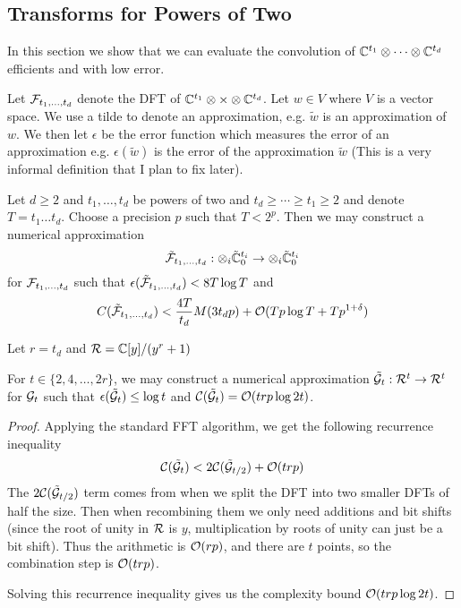 \subsection{Transforms for Powers of Two}

In this section we show that we can evaluate the convolution of ${\mathbb C}^{t_1} \otimes \cdots \otimes {\mathbb C}^{t_d}$ efficients and with low error.

Let $\mathcal F_{t_1, \ldots, t_d}$ denote the DFT of ${\mathbb C}^{t_1} \otimes \times \otimes {\mathbb C}^{t_d}$.
Let $w \in V$ where $V$ is a vector space. We use a tilde to denote an approximation, e.g. $\tilde{w}$ is an approximation of $w$. We then let $\epsilon$ be the error function which measures the error of an approximation e.g. $\epsilon(\tilde{w})$ is the error of the approximation $\tilde{w}$ (This is a very informal definition that I plan to fix later).

\begin{theorem}
    Let $d \geq 2$ and $t_1, \ldots, t_d$ be powers of two and $t_d \geq \cdots \geq t_1 \geq 2$ and denote $T = t_1 \ldots t_d$. Choose a precision $p$ such that $T < 2^p$. Then we may construct a numerical approximation
    \[
        \tilde {\mathcal F}_{t_1, \ldots, t_d} : \otimes_i \tilde{{\mathbb C}}^{t_i}_0 \to \otimes_i \tilde{{\mathbb C}}^{t_i}_0
    \]
    for $\mathcal F_{t_1, \ldots, t_d}$ such that $\epsilon(\tilde{\mathcal F}_{t_1, \ldots, t_d}) < 8 T \log T$ and
    \[
        C(\tilde{\mathcal F}_{t_1, \ldots, t_d}) < \frac{4T}{t_d} M(3t_d p) + \mathcal O(Tp\log T + Tp^{1 + \delta})
    \]
\end{theorem}

Let $r = t_d$ and $\mathcal R = {\mathbb C}[y] / (y^r + 1)$

\begin{lemma}
    For $t \in \{2, 4, \ldots, 2r\}$, we may construct a numerical approximation $\tilde{\mathcal G}_t: \mathcal R^t \to \mathcal R^t$ for $\mathcal G_t$ such that $\epsilon (\tilde{\mathcal G}_t) \leq \log t$ and $\mathcal C(\tilde{\mathcal G}_t)= \mathcal O(trp \log 2t)$.
\end{lemma}

\begin{proof}
    Applying the standard FFT algorithm, we get the following recurrence inequality
    \[
        \mathcal C(\tilde{\mathcal G}_t) < 2 \mathcal C(\tilde{\mathcal G}_{t/2}) + \mathcal O(trp)
    \]
    The $2 \mathcal C(\tilde{\mathcal G}_{t/2})$ term comes from when we split the DFT into two smaller DFTs of half the size. Then when recombining them we only need additions and bit shifts (since the root of unity in $\mathcal R$ is $y$, multiplication by roots of unity can just be a bit shift). Thus the arithmetic is $\mathcal O(rp)$, and there are $t$ points, so the combination step is $\mathcal O(trp)$.

    Solving this recurrence inequality gives us the complexity bound $\mathcal O(trp \log 2t)$.
\end{proof}

